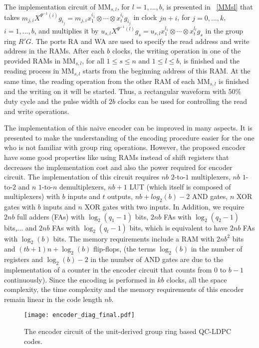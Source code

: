 \documentclass[journal,draftclsnofoot,onecolumn,12pt,twoside]{IEEEtran}
\begin{document}
The implementation circuit of $\textrm{MM}_{s,l}$, for $l=1,\ldots,b$, is presented in \figurename~\ref{MMsl}  that takes  $m_{j,i}X^{\Psi^{-1}(i)}g_{i_j}=m_{j,i}x_1^{i_1}\otimes \cdots\otimes x_t^{i_t}g_{i_j}$ in clock $jn+i$, for $j=0,\ldots,k$, $i=1,\ldots,b$, and multiplies it by $u_{s,l}X^{\Psi^{-1}(l)}g_{s}=u_{s,l}x_1^{l_1}\otimes \cdots \otimes x_t^{l_t}g_s$ in the group ring $R'G$. The ports RA and WA are used to specify the read address and  write address in the RAMs. After each $b$ clocks, the writing operation in one of the provided RAMs in $\textrm{MM}_{s,l}$, for all $1\leq s\leq n$ and $1\leq l\leq b$, is finished and the reading process in $\textrm{MM}_{s,l}$ starts from the beginning address of this RAM. At the same time, the  reading operation from the other RAM of each $\textrm{MM}_{s,l}$  is finished and the writing on it will be started. Thus, a rectangular waveform with $50\%$ duty cycle and the pulse width of $2b$ clocks can be used for controlling the read and write operations.


The implementation of this naive encoder can be improved in many aspects. It is presented to make the understanding of the encoding procedure  easier for the one who is not familiar with  group ring operations. However, the proposed encoder have some good properties like using RAMs instead of shift registers that decreases the implementation cost and also the  power required for encoder circuit. The implementation of this circuit requires $nb$ $2$-to-$1$ multiplexers, $nb$ $1$-to-$2$ and $n$ $1$-to-$n$ demultiplexers, $nb+1$  LUT (which itself is composed of multiplexers)  with $b$ inputs and $t$ outputs, $nb+log_2(b)-2$ AND gates, $n$ XOR gates with $b$ inputs and $n$ XOR gates with two inputs. In Addition, we require $2nb$ full adders (FAs) with $\log_2(q_1-1)$ bits,  $2nb$ FAs with  $\log_2(q_2-1)$ bits,... and $2nb$ FAs with  $\log_2(q_t-1)$ bits, which is equivalent to have $2nb$ FAs with $\log_2(b)$ bits. The memory requirements include a RAM with $2nb^2$ bits and $(tb+1)n+\log_2(b)$ flip-flops, (the terms $\log_2(b)$ in the number of registers and $\log_2(b)-2$ in the number of AND gates are due to the implementation of a counter in the encoder circuit that counts from $0$ to $b-1$ continuously). Since the encoding is performed in $kb$ clocks, all the space complexity, the time complexity and the memory requirements of this encoder remain linear in the code length $nb$.
\begin{figure*}
\centering
\texttt{[image: encoder\_diag\_final.pdf]}
\caption{The encoder circuit of the unit-derived group ring based QC-LDPC codes.}\label{Enc_diagram}
\hrulefill
\end{figure*}
\end{document}
